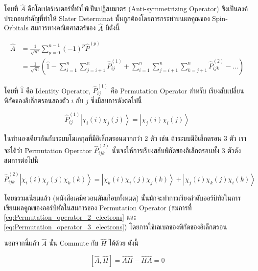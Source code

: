 \noindent โดยที่ $\hat{A}$ คือโอเปอร์เรเตอร์ที่ทำให้เป็นปฏิสมมาตร (Anti-symmetrizing Operator) ซึ่งเป็นองค์ประกอบสำคัญที่ทำให้
Slater Determinat นั้นถูกต้องโดยการกระทำบนผลคูณของ Spin-Orbitals สมการทางคณิตศาสตร์ของ $\hat{A}$ มีดังนี้

\begin{equation}
  \label{eq:Antisymmetrizing_operator}
  \begin{aligned}
    \hat{A}
     & = \frac{1}{\sqrt{n !}} \sum_{p=0}^{n-1}(-1)^p \hat{P}^{(p)}                         \\
     & = \frac{1}{\sqrt{n !}}\left(\hat{1}-\sum_{i=1}^n \sum_{j=i+1}^n \hat{P}_{i j}^{(1)}
    + \sum_{i=1}^n \sum_{j=i+1}^n \sum_{k=j+1}^n \hat{P}_{i j k}^{(2)}-\ldots\right)
  \end{aligned}
\end{equation}

\noindent โดยที่ $\hat{1}$ คือ Identity Operator, $\hat{P}_{i j}^{(1)}$ คือ Permutation Operator สำหรับ%
เรียงสับเปลี่ยนพิกัดของอิเล็กตรอนสองตัว $i$ กับ $j$ ซึ่งมีสมการดังต่อไปนี้

\begin{equation}
  \label{eq:Permutation_operator_2_electrons}
  \hat{P}_{i j}^{(1)}\left|\chi_i(i) \chi_j(j)\right\rangle
  =
  \left|\chi_j(i) \chi_i(j)\right\rangle
\end{equation}

ในทำนองเดียวกันกับระบบโมเลกุลที่มีอิเล็กตรอนมากกว่า 2 ตัว เช่น ถ้าระบบมีอิเล็กตรอน 3 ตัว เราจะได้ว่า Permutation Operator
$\hat{P}_{i j k}^{(2)}$ นั้นจะให้การเรียงสลับพิกัดของอิเล็กตรอนทั้ง 3 ตัวดังสมการต่อไปนี้

\begin{equation}
  \label{eq:Permutation_operator_3_electrons}
  \hat{P}_{i j k}^{(2)}\left|\chi_i(i) \chi_j(j) \chi_k(k)\right\rangle
  =
  \left|\chi_k(i) \chi_i(j) \chi_j(k)\right\rangle
  + \left|\chi_j(i) \chi_k(j) \chi_i(k)\right\rangle
\end{equation}

โดยธรรมเนียมแล้ว (หนังสือเคมีควอนตัมเกือบทั้งหมด) นั้นมักจะทำการเรียงลำดับออร์บิทัลในการเขียนผลคูณของออร์บิทัลในสมการของ Permutation
Operator (สมการที่ \eqref{eq:Permutation_operator_2_electrons} และ \eqref{eq:Permutation_operator_3_electrons})
โดยการใช้เลเบลของพิกัดของอิเล็กตรอน

นอกจากนี้แล้ว $\hat{A}$ นั้น Commute กับ $\hat{H}$ ได้ด้วย ดังนี้

\begin{equation}
  \label{eq:Antisym_Hamiltonian_commute}
  [\hat{A}, \hat{H}]
  = \hat{A} \hat{H}-\hat{H} \hat{A}
  = 0
\end{equation}

